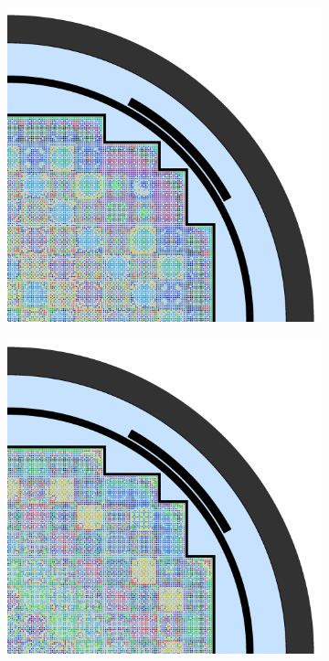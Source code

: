 \begin{figure}[h!]
\begin{subfigure}{0.48\textwidth}
  \includegraphics[width=0.9\linewidth]{figures/unsupervised/geometries/with-features/16-clusters/combined/full-core}
  \caption{}
  \label{fig:chap10-full-core-combined-16}
\end{subfigure}
\begin{subfigure}{0.48\textwidth}
  \centering
  \includegraphics[width=0.9\linewidth]{figures/unsupervised/geometries/with-features/32-clusters/pinch/full-core}

\end{subfigure}
\end{figure}
